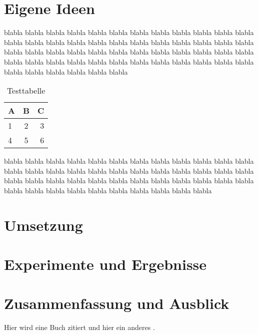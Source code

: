 \documentclass[12pt,a4paper,DIV13,pdftex,BCOR10mm,fleqn,liststotoc,bibtotoc,cleardoubleempty]{scrbook}
\begin{document}
\chapter{Eigene Ideen}
blabla blabla blabla blabla blabla blabla blabla blabla blabla blabla blabla blabla blabla blabla blabla blabla blabla blabla blabla blabla blabla blabla blabla blabla blabla blabla blabla blabla blabla blabla blabla blabla blabla blabla blabla blabla blabla blabla blabla blabla blabla blabla blabla blabla blabla blabla blabla blabla blabla blabla blabla blabla blabla blabla
\begin{table}[ht]
\centering
\begin{tabular}{|l|c|r}
  \hline
  A & B & C \\
\hline
 1 & 2 & 3  \\
\hline
 4 & 5 & 6 \\
\end{tabular}
\caption{Testtabelle}
\label{Testtabelle}
\end{table}
blabla blabla blabla blabla blabla blabla blabla blabla blabla blabla blabla blabla blabla blabla blabla blabla blabla blabla blabla blabla blabla blabla blabla blabla blabla blabla blabla blabla blabla blabla blabla blabla blabla blabla blabla blabla blabla blabla blabla blabla blabla blabla blabla blabla blabla blabla
\chapter{Umsetzung}
\chapter{Experimente und Ergebnisse}
\chapter{Zusammenfassung und Ausblick}
Hier wird eine Buch zitiert\cite{CAVE_0394} und hier ein anderes \cite{CAVE_0394}.

%
%
%

\backmatter
%

\nocite{*}

\end{document}
